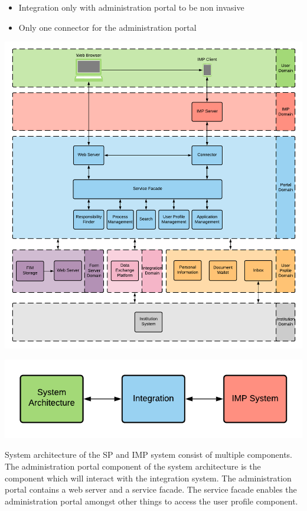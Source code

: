 \begin{itemize}
    \item Integration only with administration portal to be non invasive
    \item Only one connector for the administration portal
\end{itemize}

\begin{center}
    \includegraphics[scale=0.6]{Diagrams/Integration Architecture 1/Overview.pdf}
\end{center}

\begin{center}
    \includegraphics[scale=0.6]{Diagrams/Integration Architecture 1/Technological Integration/1. Integration Overview.pdf}
\end{center}

System architecture of the SP and IMP system consist of multiple components. The administration portal component of the system architecture is the component which will interact with the integration system. The administration portal contains a web server and a service facade. The service facade enables the administration portal amongst other things to access the user profile component. 


